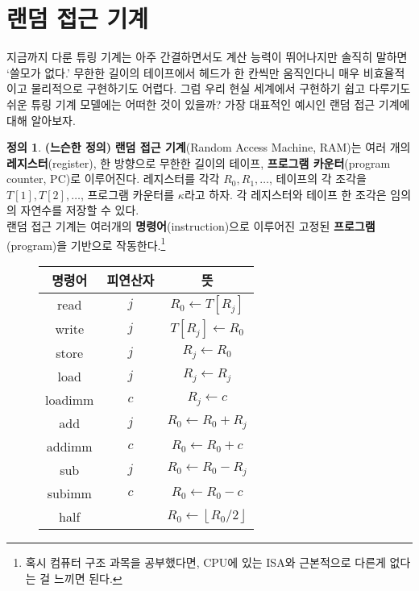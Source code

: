 \documentclass[b5paper, 11pt]{book}
\theoremstyle{definition}
\newtheorem{defn}{정의}[chapter]
\begin{document}
\section{랜덤 접근 기계}
지금까지 다룬 튜링 기계는 아주 간결하면서도 계산 능력이 뛰어나지만 솔직히 말하면 `쓸모가 없다.' 무한한 길이의 테이프에서 헤드가 한 칸씩만 움직인다니 매우 비효율적이고 물리적으로 구현하기도 어렵다. 그럼 우리 현실 세계에서 구현하기 쉽고 다루기도 쉬운 튜링 기계 모델에는 어떠한 것이 있을까? 가장 대표적인 예시인 랜덤 접근 기계에 대해 알아보자.
\begin{defn} \label{ram definition}
    \textbf{(느슨한 정의)}
    \textbf{랜덤 접근 기계}(Random Access Machine, RAM)는 여러 개의 \textbf{레지스터}(register), 한 방향으로 무한한 길이의 테이프, \textbf{프로그램 카운터}(program counter, PC)로 이루어진다. 레지스터를 각각 $R_0, R_1, \ldots$, 테이프의 각 조각을 $T[1], T[2], \ldots $, 프로그램 카운터를 $\kappa$라고 하자. 각 레지스터와 테이프 한 조각은 임의의 자연수를 저장할 수 있다. \\ 
    랜덤 접근 기계는 여러개의 \textbf{명령어}(instruction)으로 이루어진 고정된 \textbf{프로그램}(program)을 기반으로 작동한다.\footnote{혹시 컴퓨터 구조 과목을 공부했다면, CPU에 있는 ISA와 근본적으로 다른게 없다는 걸 느끼면 된다.}
    \begin{figure}[!ht] 
        \centering
        \begin{tabular}{ ccc }
            명령어 & 피연산자 & 뜻 \\ 
            \hline
            \hline
            read & $j$ & $R_0 \gets T[R_j]$ \\ 
            \hline
            write & $j$ & $T[R_j] \gets R_0$ \\ 
            \hline 
            store & $j$ & $R_j \gets R_0$ \\ 
            \hline 
            load & $j$ & $R_j \gets R_j$ \\ 
            \hline 
            loadimm & $c$ & $R_j \gets c$ \\ 
            \hline 
            add & $j$ & $R_0 \gets R_0 + R_j$ \\ 
            \hline 
            addimm & $c$ & $R_0 \gets R_0 + c$ \\ 
            \hline 
            sub & $j$ & $R_0 \gets R_0 - R_j$ \\ 
            \hline
            subimm & $c$ & $R_0 \gets R_0 - c$ \\ 
            \hline 
            half & & $R_0 \gets \left\lfloor R_0 / 2 \right\rfloor$ \\ 

\end{tabular}
\end{figure}
\end{defn}
\end{document}
